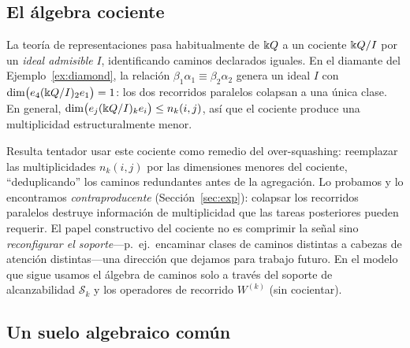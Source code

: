 \subsection{El álgebra cociente}

La teoría de representaciones pasa habitualmente de $\Bbbk Q$ a un cociente $\Bbbk Q/I$ por un
\emph{ideal admisible} $I$, identificando caminos declarados iguales. En el
diamante del Ejemplo~\ref{ex:diamond}, la relación $\beta_1\alpha_1\equiv
\beta_2\alpha_2$ genera un ideal $I$ con
$\dim\bigl(e_4(\Bbbk Q/I)_2 e_1\bigr)=1$: los dos recorridos paralelos colapsan a una única
clase. En general, $\dim\bigl(e_j(\Bbbk Q/I)_k e_i\bigr)\le n_k(i,j)$, así que el
cociente produce una multiplicidad estructuralmente menor.

Resulta tentador usar este cociente como remedio del over-squashing:
reemplazar las multiplicidades $n_k(i,j)$ por las dimensiones menores del cociente,
``deduplicando'' los caminos redundantes antes de la agregación. Lo probamos y
lo encontramos \emph{contraproducente} (Sección~\ref{sec:exp}): colapsar los recorridos paralelos
destruye información de multiplicidad que las tareas posteriores pueden requerir. El
papel constructivo del cociente no es comprimir la señal sino
\emph{reconfigurar el soporte}---p.\ ej.\ encaminar clases de caminos distintas a cabezas de
atención distintas---una dirección que dejamos para trabajo futuro. En el modelo que sigue
usamos el álgebra de caminos solo a través del soporte de alcanzabilidad $\mathcal{S}_k$ y
los operadores de recorrido $W^{(k)}$ (sin cocientar).

\subsection{Un suelo algebraico común}\label{sec:ground}

